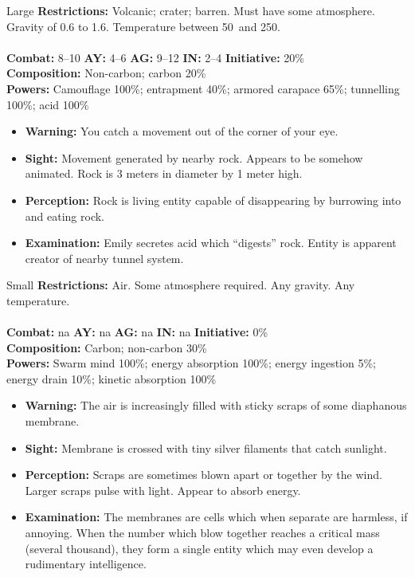 \hrulefill

\begin{creature}{Large}
\textbf{Restrictions:} Volcanic; crater; barren. Must have some atmosphere. Gravity of 0.6 to 1.6. Temperature between 50\textdegree\ and 250\textdegree. \\\\
\textbf{Combat:} 8--10 \textbf{AY:} 4--6 \textbf{AG:} 9--12 \textbf{IN:} 2--4 \textbf{Initiative:} 20\% \\
\textbf{Composition:} Non-carbon; carbon 20\% \\
\textbf{Powers:} Camouflage 100\%; entrapment 40\%; armored carapace 65\%; tunnelling 100\%; acid 100\% 
\begin{itemize}
\item \textbf{Warning:} You catch a movement out of the corner of your eye. 
\item \textbf{Sight:} Movement generated by nearby rock. Appears to be somehow animated. Rock is 3 meters in diameter by 1 meter high. 
\item \textbf{Perception:} Rock is living entity capable of disappearing by burrowing into and eating rock. 
\item \textbf{Examination:} Emily secretes acid which ``digests'' rock. Entity is apparent creator of nearby tunnel system. 
\end{itemize}
\end{creature}

\hrulefill

\begin{creature}{Small}
\textbf{Restrictions:} Air. Some atmosphere required. Any gravity. Any temperature. \\\\
\textbf{Combat:} na \textbf{AY:} na \textbf{AG:} na \textbf{IN:} na \textbf{Initiative:} 0\% \\
\textbf{Composition:} Carbon; non-carbon 30\% \\
\textbf{Powers:} Swarm mind 100\%; energy absorption 100\%; energy ingestion 5\%; energy drain 10\%; kinetic absorption 100\% 
\begin{itemize}
\item \textbf{Warning:} The air is increasingly filled with sticky scraps of some diaphanous membrane. 
\item \textbf{Sight:} Membrane is crossed with tiny silver filaments that catch sunlight. 
\item \textbf{Perception:} Scraps are sometimes blown apart or together by the wind. Larger scraps pulse with light. Appear to absorb energy. 
\item \textbf{Examination:} The membranes are cells which when separate are harmless, if annoying. When the number which blow together 
reaches a critical mass (several thousand), they form a single entity which may even develop a rudimentary intelligence. 
\end{itemize}
\end{creature}

